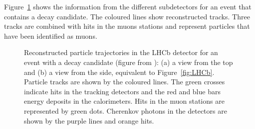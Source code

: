 Figure~\ref{fig:event} shows the information from the different subdetectors for an event that contains a \BstoJpsiKK{} decay candidate.
The coloured lines show reconstructed tracks. Three tracks are combined with hits in the muons stations and represent particles that have
been identified as muons.
\begin{figure}[ptb]
  \centering
  \caption{Reconstructed particle trajectories in the LHCb detector for an event with a \BstoJpsiKK{} decay candidate
           (figure from \cite{vanEijk:2012}):
           (a) a view from the top and (b) a view from the side, equivalent to Figure~\ref{fig:LHCb}.
           Particle tracks are shown by the coloured lines. The green crosses indicate hits in the tracking detectors and the red and blue
           bars energy deposits in the calorimeters. Hits in the muon stations are represented by green dots. Cherenkov photons in the
           \rich{} detectors are shown by the purple lines and orange hits.}
  \label{fig:event}
\end{figure}
